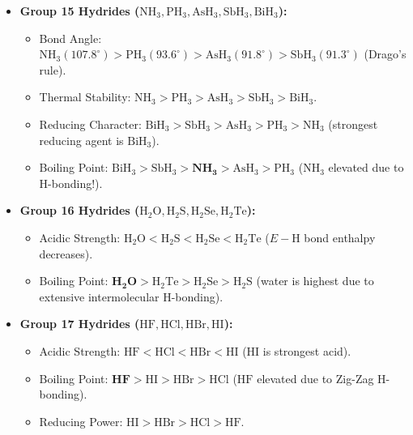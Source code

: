 \documentclass[10pt,twoside,openright]{book}
\begin{document}
\begin{usecasebox}
\begin{itemize}
  \item \textbf{Group 15 Hydrides ($\text{NH}_3, \text{PH}_3, \text{AsH}_3, \text{SbH}_3, \text{BiH}_3$):}
  \begin{itemize}
    \item Bond Angle: $\text{NH}_3 (107.8^\circ) > \text{PH}_3 (93.6^\circ) > \text{AsH}_3 (91.8^\circ) > \text{SbH}_3 (91.3^\circ)$ (Drago's rule).
    \item Thermal Stability: $\text{NH}_3 > \text{PH}_3 > \text{AsH}_3 > \text{SbH}_3 > \text{BiH}_3$.
    \item Reducing Character: $\text{BiH}_3 > \text{SbH}_3 > \text{AsH}_3 > \text{PH}_3 > \text{NH}_3$ (strongest reducing agent is $\text{BiH}_3$).
    \item Boiling Point: $\text{BiH}_3 > \text{SbH}_3 > \mathbf{\text{NH}_3} > \text{AsH}_3 > \text{PH}_3$ ($\text{NH}_3$ elevated due to H-bonding!).
  \end{itemize}
  \item \textbf{Group 16 Hydrides ($\text{H}_2\text{O}, \text{H}_2\text{S}, \text{H}_2\text{Se}, \text{H}_2\text{Te}$):}
  \begin{itemize}
    \item Acidic Strength: $\text{H}_2\text{O} < \text{H}_2\text{S} < \text{H}_2\text{Se} < \text{H}_2\text{Te}$ ($E-\text{H}$ bond enthalpy decreases).
    \item Boiling Point: $\mathbf{\text{H}_2\text{O}} > \text{H}_2\text{Te} > \text{H}_2\text{Se} > \text{H}_2\text{S}$ (water is highest due to extensive intermolecular H-bonding).
  \end{itemize}
  \item \textbf{Group 17 Hydrides ($\text{HF}, \text{HCl}, \text{HBr}, \text{HI}$):}
  \begin{itemize}
    \item Acidic Strength: $\text{HF} < \text{HCl} < \text{HBr} < \text{HI}$ ($\text{HI}$ is strongest acid).
    \item Boiling Point: $\mathbf{\text{HF}} > \text{HI} > \text{HBr} > \text{HCl}$ ($\text{HF}$ elevated due to Zig-Zag H-bonding).
    \item Reducing Power: $\text{HI} > \text{HBr} > \text{HCl} > \text{HF}$.
  \end{itemize}
\end{itemize}
\end{usecasebox}
\end{document}
